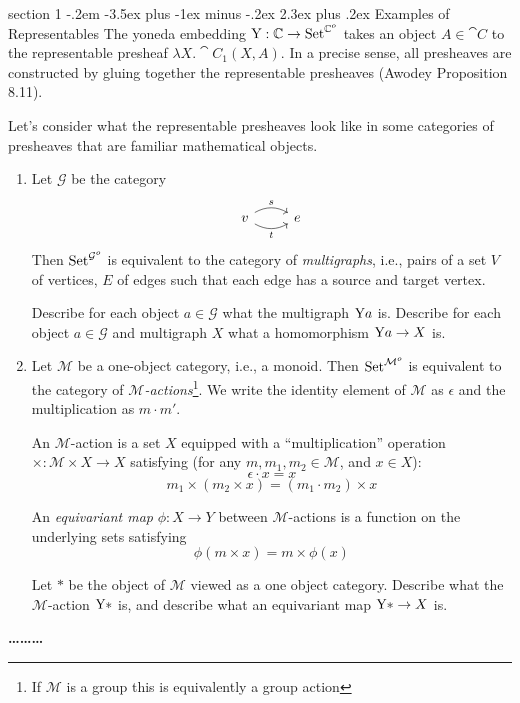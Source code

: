 \documentclass[12pt]{article}
\makeatletter
\newenvironment{problem}{\@startsection
       {section}
       {1}
       {-.2em}
       {-3.5ex plus -1ex minus -.2ex}
       {2.3ex plus .2ex}
       {\pagebreak[3]%
       \large\bf\noindent{Problem }
       }
       }
       {%
       \begin{center}\large\bf \ldots\ldots\ldots\end{center}}
\makeatother
\begin{document}
\begin{problem}{Examples of Representables}
  The yoneda embedding $\textrm{Y} : \mathbb C \to \textrm{Set}^{\mathbb C^o}$ takes an
  object $A \in \cat C$ to the representable presheaf $\lambda X. \cat
  C_1(X,A)$. In a precise sense, all presheaves are constructed by
  gluing together the representable presheaves (Awodey Proposition
  8.11).

  Let's consider what the representable presheaves look
  like in some categories of presheaves that are familiar mathematical
  objects.

  \begin{enumerate}
  \item Let $\mathcal G$ be the category
    \[%
    \begin{tikzcd}
      v \arrow[r, "s", bend left] \arrow[r, "t"', bend right] & e
    \end{tikzcd}\]
    Then $\textrm{Set}^{\mathcal G^o}$ is equivalent to the category of
    \emph{multigraphs}, i.e., pairs of a set $V$ of vertices, $E$ of
    edges such that each edge has a source and target vertex.

    Describe for each object $a \in \mathcal G$ what the multigraph
    $\textrm{Y} a$ is. Describe for each object $a \in \mathcal G$ and
    multigraph $X$ what a homomorphism $\textrm{Y} a \to X$ is.

  \item Let $\mathcal M$ be a one-object category, i.e., a
    monoid. Then $\textrm{Set}^{\mathcal M^o}$ is equivalent to the category
    of \emph{$\mathcal M$-actions}\footnote{If $\mathcal M$ is a group
    this is equivalently a group action}. We write the identity
    element of $\mathcal M$ as $\epsilon$ and the multiplication as $m
    \cdot m'$.

    An $\mathcal M$-action is a set
    $X$ equipped with a ``multiplication'' operation $\times :
    \mathcal M \times X \to X$ satisfying (for any $m, m_1,m_2 \in
    \mathcal M$, and $x \in X$):
    \[ \epsilon \cdot x = x \]
    \[ m_1 \times (m_2 \times x) = (m_1 \cdot m_2) \times x \]

    An \emph{equivariant map} $\phi : X \to Y$ between $\mathcal
    M$-actions is a function on the underlying sets satisfying
    \[ \phi(m \times x) = m \times \phi(x) \]

    Let $*$ be the object of $\mathcal M$ viewed as a one object
    category. Describe what the $\mathcal M$-action $\textrm{Y} *$ is, and
    describe what an equivariant map $\textrm{Y} * \to X$ is.


\end{enumerate}
\end{problem}
\end{document}
